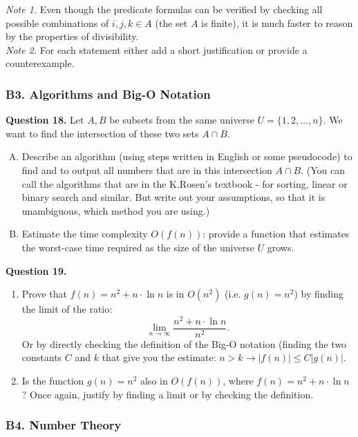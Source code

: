 \documentclass[jou]{apa6}
\begin{document}
{\em Note 1.} Even though the predicate formulas can be verified
by checking all possible combinations of $i,j,k \in A$ (the set $A$ is finite), 
it is much faster to reason by the properties of divisibility.\\
{\em Note 2.} For each statement either add a short justification or provide
a counterexample.






\subsubsection{B3. Algorithms and Big-O Notation} 

{\bf Question 18.} Let $A,B$ be subsets from the same universe $U = \{ 1,2,\ldots,n \}$. 
We want to find the intersection of these two sets $A \cap B$. 

\begin{enumerate}[(A)]
\item Describe an algorithm (using steps written in English or some pseudocode) 
to find and to output all numbers that are in this intersection $A \cap B$. 
(You can call the algorithms that are in the K.Rosen's textbook - for sorting, 
linear or binary search and similar. But write out your assumptions, so that it is unambiguous, 
which method you are using.)
\item Estimate the time complexity $O(f(n))$: provide a function that estimates the 
worst-case time required as the size of the universe $U$ grows.
\end{enumerate}

\vspace{6pt}
{\bf Question 19.} 
\begin{enumerate}
\item 
Prove that $f(n) = n^2 + n \cdot \ln n$ is in $O(n^2)$ (i.e. $g(n) = n^2$) by finding the limit
of the ratio:
$$\lim_{n \rightarrow \infty} \frac{n^2 + n \cdot \ln n}{n^2}.$$
Or by directly checking the definition of the Big-O notation (finding the two 
constants $C$ and $k$ that give you the estimate: 
$n>k \rightarrow |f(n)| \leq C|g(n)|$.
\item Is the function $g(n) = n^2$ also in $O(f(n))$, where $f(n) = n^2 + n \cdot \ln n$? 
Once again, justify by finding a limit or by checking the definition.
\end{enumerate}





\subsubsection{B4. Number Theory} 
\end{document}
